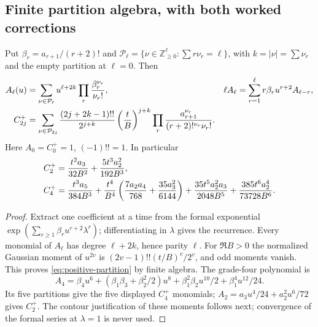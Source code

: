 \subsection{Finite partition algebra, with both worked corrections}
\begin{proposition}
\label{prop:positive-coefficients}
Put $\beta_r=a_{r+1}/(r+2)!$ and
$\mathcal P_\ell=\{\nu\in\mathbb Z_{\ge0}^{\ell}:\sum r\nu_r=\ell\}$,
with $k=|\nu|=\sum\nu_r$ and the empty partition at $\ell=0$.
Then
\begin{align}
 A_\ell(u)&=\sum_{\nu\in\mathcal P_\ell}u^{\ell+2k}
                  \prod_r\frac{\beta_r^{\nu_r}}{\nu_r!},
 &\ell A_\ell&=\sum_{r=1}^{\ell}r\beta_ru^{r+2}A_{\ell-r},\notag\\
 C_{2j}^{+}&=\sum_{\nu\in\mathcal P_{2j}}
 \frac{(2j+2k-1)!!}{2^{j+k}}\left(\frac tB\right)^{j+k}
 \prod_r\frac{a_{r+1}^{\nu_r}}{(r+2)!^{\nu_r}\nu_r!}.
 \label{eq:positive-partition}
\end{align}
Here $A_0=C_0^+=1$, $(-1)!!=1$. In particular
\begin{align}
 C_2^+&=\frac{t^2a_3}{32B^2}+\frac{5t^3a_2^2}{192B^3},\notag\\
 C_4^+&=\frac{t^3a_5}{384B^3}
 +\frac{t^4}{B^4}\left(\frac{7a_2a_4}{768}
                         +\frac{35a_3^2}{6144}\right)
 +\frac{35t^5a_2^2a_3}{2048B^5}
 +\frac{385t^6a_2^4}{73728B^6}.
 \label{eq:positive-c2-c4}
\end{align}
\end{proposition}
\begin{proof}
Extract one coefficient at a time from the formal exponential
$\exp(\sum_{r\ge1}\beta_ru^{r+2}\lambda^r)$; differentiating in
$\lambda$ gives the recurrence. Every monomial of $A_\ell$ has
degree $\ell+2k$, hence parity $\ell$. For $\Re B>0$ the normalized
Gaussian moment of $u^{2v}$ is $(2v-1)!!(t/B)^v/2^v$, and odd
moments vanish. This proves \eqref{eq:positive-partition} by finite
algebra. The grade-four polynomial is
\[
 A_4=\beta_4u^6+(\beta_1\beta_3+\beta_2^2/2)u^8
       +\beta_1^2\beta_2u^{10}/2+\beta_1^4u^{12}/24.
\]
Its five partitions give the five displayed $C_4^+$ monomials;
$A_2=a_3u^4/24+a_2^2u^6/72$ gives $C_2^+$. The contour
justification of these moments follows next; convergence of the
formal series at $\lambda=1$ is never used.
\end{proof}

